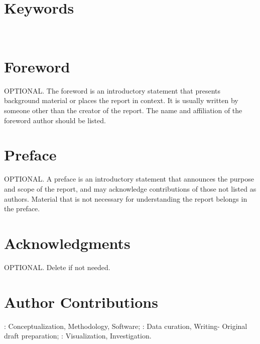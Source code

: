\begin{titlepage}
        \section*{Keywords}
        \keywords
        \newpage
        \vspace*{-3cm}\small{\pubnumber \newline  \pubmonth~\pubyear}
        \vspace{18pt}
        \begin{center}
        	\tableofcontents
        	\appendixtitleon
            \appendixtitletocon
        	\listoftables
        	\listoffigures
        \end{center}
        \pagebreak
        \thispagestyle{fancy}
        \renewcommand{\headrulewidth}{0pt}
          \fancyhead{}
          \fancyhead[l]{\small \pubnumber \\ 
        	\small \pubmonth~\pubyear \\}
        	\fancyfoot[c]{\thepage}
        \section*{Foreword}
        OPTIONAL. The foreword is an introductory statement that presents background material or places the report in context. It is usually written by someone other than the creator of the report. The name and affiliation of the foreword author should be listed.
        \section*{Preface}
        OPTIONAL. A preface is an introductory statement that announces the purpose and scope of the report, and may acknowledge contributions of those not listed as authors. Material that is not necessary for understanding the report belongs in the preface. 
        \section*{Acknowledgments}
        OPTIONAL. Delete if not needed.
        \section*{Author Contributions}
        \textbf{\authorone}: Conceptualization, Methodology, Software; \textbf{\authortwo}: Data curation, Writing- Original draft preparation; \textbf{\authorthree}: Visualization, Investigation.
        
    \end{titlepage}
